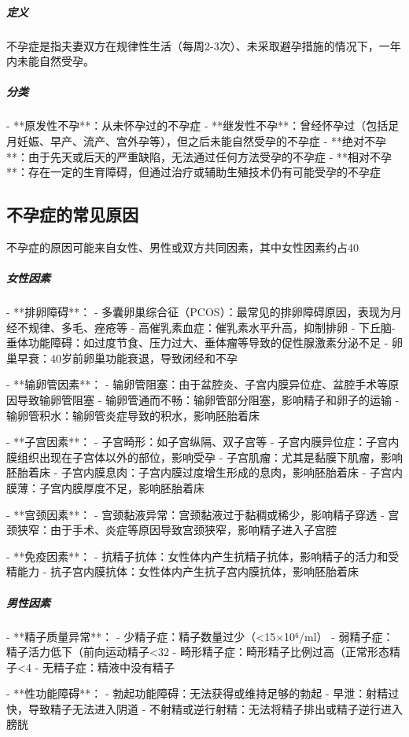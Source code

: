 \begin{enumerate}
\subparagraph{定义}
不孕症是指夫妻双方在规律性生活（每周2-3次）、未采取避孕措施的情况下，一年内未能自然受孕。

\subparagraph{分类}

- **原发性不孕**：从未怀孕过的不孕症
- **继发性不孕**：曾经怀孕过（包括足月妊娠、早产、流产、宫外孕等），但之后未能自然受孕的不孕症
- **绝对不孕**：由于先天或后天的严重缺陷，无法通过任何方法受孕的不孕症
- **相对不孕**：存在一定的生育障碍，但通过治疗或辅助生殖技术仍有可能受孕的不孕症

\subsection{不孕症的常见原因}

不孕症的原因可能来自女性、男性或双方共同因素，其中女性因素约占40%

\subparagraph{女性因素}

- **排卵障碍**：
  - 多囊卵巢综合征（PCOS）：最常见的排卵障碍原因，表现为月经不规律、多毛、痤疮等
  - 高催乳素血症：催乳素水平升高，抑制排卵
  - 下丘脑-垂体功能障碍：如过度节食、压力过大、垂体瘤等导致的促性腺激素分泌不足
  - 卵巢早衰：40岁前卵巢功能衰退，导致闭经和不孕

- **输卵管因素**：
  - 输卵管阻塞：由于盆腔炎、子宫内膜异位症、盆腔手术等原因导致输卵管阻塞
  - 输卵管通而不畅：输卵管部分阻塞，影响精子和卵子的运输
  - 输卵管积水：输卵管炎症导致的积水，影响胚胎着床

- **子宫因素**：
  - 子宫畸形：如子宫纵隔、双子宫等
  - 子宫内膜异位症：子宫内膜组织出现在子宫体以外的部位，影响受孕
  - 子宫肌瘤：尤其是黏膜下肌瘤，影响胚胎着床
  - 子宫内膜息肉：子宫内膜过度增生形成的息肉，影响胚胎着床
  - 子宫内膜薄：子宫内膜厚度不足，影响胚胎着床

- **宫颈因素**：
  - 宫颈黏液异常：宫颈黏液过于黏稠或稀少，影响精子穿透
  - 宫颈狭窄：由于手术、炎症等原因导致宫颈狭窄，影响精子进入子宫腔

- **免疫因素**：
  - 抗精子抗体：女性体内产生抗精子抗体，影响精子的活力和受精能力
  - 抗子宫内膜抗体：女性体内产生抗子宫内膜抗体，影响胚胎着床

\subparagraph{男性因素}

- **精子质量异常**：
  - 少精子症：精子数量过少（<15×10⁶/ml）
  - 弱精子症：精子活力低下（前向运动精子<32%
  - 畸形精子症：畸形精子比例过高（正常形态精子<4%
  - 无精子症：精液中没有精子

- **性功能障碍**：
  - 勃起功能障碍：无法获得或维持足够的勃起
  - 早泄：射精过快，导致精子无法进入阴道
  - 不射精或逆行射精：无法将精子排出或精子逆行进入膀胱


\end{enumerate}
